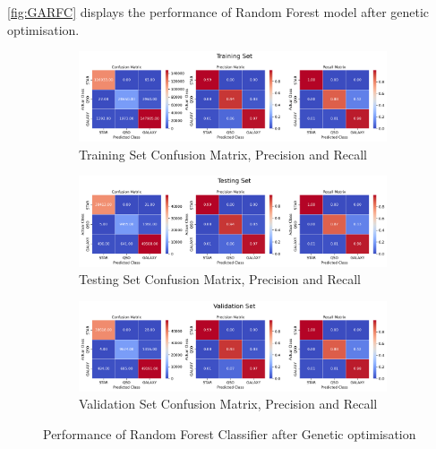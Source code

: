 \autoref{fig:GARFC} displays the performance of Random Forest model after genetic optimisation. 
\begin{figure}[H]
    \centering
    \begin{subfigure}{\textwidth}
        \includegraphics[width=\linewidth]{images/GA_RFC_Train.png}
        \caption{Training Set Confusion Matrix, Precision and Recall}
        \label{fig:GARFCTrain}
    \end{subfigure}
    \begin{subfigure}{\textwidth}
        \includegraphics[width=\linewidth]{images/GA_RFC_Test.png}
        \caption{Testing Set Confusion Matrix, Precision and Recall}
        \label{fig:GARFCTest}
    \end{subfigure}
    \begin{subfigure}{\textwidth}
        \includegraphics[width=\linewidth]{images/GA_RFC_Val.png}
        \caption{Validation Set Confusion Matrix, Precision and Recall}
        \label{fig:GARFCVal}
    \end{subfigure}
    \caption{Performance of Random Forest Classifier after Genetic optimisation}
    \label{fig:GARFC}
\end{figure}

